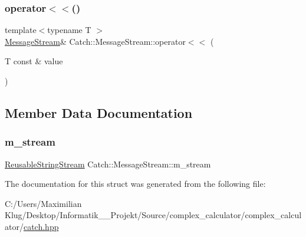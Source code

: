 \subsubsection{\texorpdfstring{operator$<$$<$()}{operator<<()}}
{\footnotesize\ttfamily template$<$typename T $>$ \\
\mbox{\hyperlink{struct_catch_1_1_message_stream}{Message\+Stream}}\& Catch\+::\+Message\+Stream\+::operator$<$$<$ (\begin{DoxyParamCaption}\item[{T const \&}]{value }\end{DoxyParamCaption})\hspace{0.3cm}{\ttfamily [inline]}}



\subsection{Member Data Documentation}
\mbox{\label{struct_catch_1_1_message_stream_a9202520faed8882ef469db9f353ec578}} 
\subsubsection{\texorpdfstring{m\+\_\+stream}{m\_stream}}
{\footnotesize\ttfamily \mbox{\hyperlink{class_catch_1_1_reusable_string_stream}{Reusable\+String\+Stream}} Catch\+::\+Message\+Stream\+::m\+\_\+stream}



The documentation for this struct was generated from the following file\+:\begin{DoxyCompactItemize}
\item 
C\+:/\+Users/\+Maximilian Klug/\+Desktop/\+Informatik\+\_\+\_\+\+Projekt/\+Source/complex\+\_\+calculator/complex\+\_\+calculator/\mbox{\hyperlink{catch_8hpp}{catch.\+hpp}}\end{DoxyCompactItemize}
